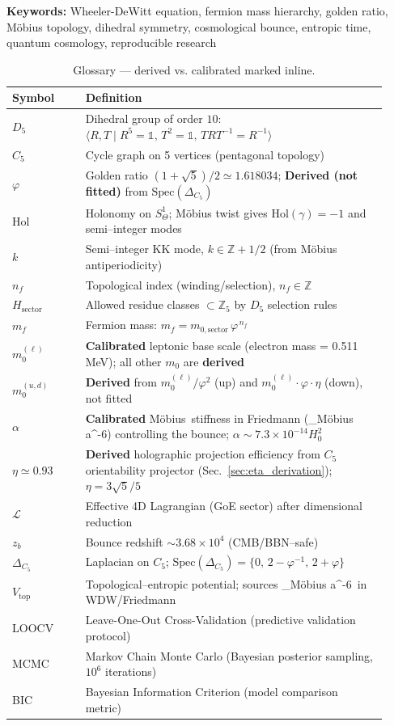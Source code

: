 \documentclass[12pt]{article}
\newcommand{\Moebius}{M\"obius}
\newcommand{\SigMoeb}{\Sigma\text{--}\Moebius}
\newcommand{\StiffTerm}{\alpha_{\SigMoeb} a^{-6}}
\begin{document}
\textbf{Keywords:} Wheeler-DeWitt equation, fermion mass hierarchy, golden ratio, M\"obius topology, dihedral symmetry, cosmological bounce, entropic time, quantum cosmology, reproducible research

\begin{table}[ht]
\centering
\caption{Glossary — derived vs. calibrated marked inline.}
\label{tab:glossary}
\begin{tabular}{p{0.18\linewidth}p{0.74\linewidth}}
\toprule
\textbf{Symbol} & \textbf{Definition} \\
\midrule
$D_5$ & Dihedral group of order $10$: $\langle R,T \mid R^5=\mathbb{1},\,T^2=\mathbb{1},\,TRT^{-1}=R^{-1}\rangle$ \\
$C_5$ & Cycle graph on 5 vertices (pentagonal topology) \\
$\varphi$ & Golden ratio $(1+\sqrt{5})/2\simeq1.618034$; \textbf{Derived (not fitted)} from $\mathrm{Spec}(\Delta_{C_5})$ \\
$\mathrm{Hol}$ & Holonomy on $S^1_\Theta$; M\"obius twist gives $\mathrm{Hol}(\gamma)=-1$ and semi--integer modes \\
$k$ & Semi--integer KK mode, $k\in\mathbb{Z}+1/2$ (from M\"obius antiperiodicity) \\
$n_f$ & Topological index (winding/selection), $n_f\in\mathbb{Z}$ \\
$H_{\text{sector}}$ & Allowed residue classes $\subset\mathbb{Z}_5$ by $D_5$ selection rules \\
$m_f$ & Fermion mass: $m_f=m_{0,\text{sector}}\,\varphi^{\,n_f}$ \\
$m_0^{(\ell)}$ & \textbf{Calibrated} leptonic base scale (electron mass = 0.511 MeV); all other $m_0$ are \textbf{derived} \\
$m_0^{(u,d)}$ & \textbf{Derived} from $m_0^{(\ell)}/\varphi^2$ (up) and $m_0^{(\ell)} \cdot \varphi \cdot \eta$ (down), not fitted \\
$\alpha$ & \textbf{Calibrated} \SigMoeb\ stiffness in Friedmann (\StiffTerm) controlling the bounce; $\alpha \sim 7.3 \times 10^{-14} H_0^2$ \\
$\eta \simeq 0.93$ & \textbf{Derived} holographic projection efficiency from $C_5$ orientability projector (Sec.~\ref{sec:eta_derivation}); $\eta = 3\sqrt{5}/5$ \\
$\mathcal{L}$ & Effective 4D Lagrangian (GoE sector) after dimensional reduction \\
$z_b$ & Bounce redshift $\sim 3.68\times10^4$ (CMB/BBN--safe) \\
$\Delta_{C_5}$ & Laplacian on $C_5$; $\mathrm{Spec}(\Delta_{C_5})=\{0,\,2-\varphi^{-1},\,2+\varphi\}$ \\
$V_{\text{top}}$ & Topological--entropic potential; sources \StiffTerm\ in WDW/Friedmann \\
LOOCV & Leave-One-Out Cross-Validation (predictive validation protocol) \\
MCMC & Markov Chain Monte Carlo (Bayesian posterior sampling, $10^6$ iterations) \\
BIC & Bayesian Information Criterion (model comparison metric) \\
\bottomrule
\end{tabular}
\end{table}
\end{document}
